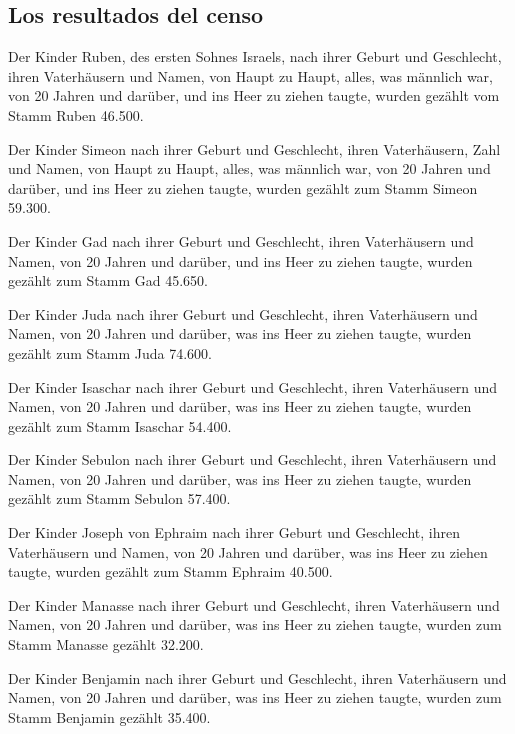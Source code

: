 \hypertarget{los-resultados-del-censo}{%
\subsection{Los resultados del censo}\label{los-resultados-del-censo}}

 Der Kinder Ruben, des ersten Sohnes Israels, nach ihrer
Geburt und Geschlecht, ihren Vaterhäusern und Namen, von Haupt zu Haupt,
alles, was männlich war, von 20 Jahren und darüber, und ins Heer zu
ziehen taugte,  wurden gezählt vom Stamm Ruben 46.500.

 Der Kinder Simeon nach ihrer Geburt und Geschlecht,
ihren Vaterhäusern, Zahl und Namen, von Haupt zu Haupt, alles, was
männlich war, von 20 Jahren und darüber, und ins Heer zu ziehen taugte,
 wurden gezählt zum Stamm Simeon 59.300.

 Der Kinder Gad nach ihrer Geburt und Geschlecht, ihren
Vaterhäusern und Namen, von 20 Jahren und darüber, und ins Heer zu
ziehen taugte,  wurden gezählt zum Stamm Gad 45.650.

 Der Kinder Juda nach ihrer Geburt und Geschlecht, ihren
Vaterhäusern und Namen, von 20 Jahren und darüber, was ins Heer zu
ziehen taugte,  wurden gezählt zum Stamm Juda 74.600.

 Der Kinder Isaschar nach ihrer Geburt und Geschlecht,
ihren Vaterhäusern und Namen, von 20 Jahren und darüber, was ins Heer zu
ziehen taugte,  wurden gezählt zum Stamm Isaschar 54.400.

 Der Kinder Sebulon nach ihrer Geburt und Geschlecht,
ihren Vaterhäusern und Namen, von 20 Jahren und darüber, was ins Heer zu
ziehen taugte,  wurden gezählt zum Stamm Sebulon 57.400.

 Der Kinder Joseph von Ephraim nach ihrer Geburt und
Geschlecht, ihren Vaterhäusern und Namen, von 20 Jahren und darüber, was
ins Heer zu ziehen taugte,  wurden gezählt zum Stamm
Ephraim 40.500.

 Der Kinder Manasse nach ihrer Geburt und Geschlecht,
ihren Vaterhäusern und Namen, von 20 Jahren und darüber, was ins Heer zu
ziehen taugte,  wurden zum Stamm Manasse gezählt 32.200.

 Der Kinder Benjamin nach ihrer Geburt und Geschlecht,
ihren Vaterhäusern und Namen, von 20 Jahren und darüber, was ins Heer zu
ziehen taugte,  wurden zum Stamm Benjamin gezählt 35.400.

